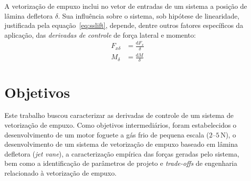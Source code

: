 A vetorização de empuxo inclui no vetor de entradas de um sistema a posição de lâmina defletora \(\delta \). Sua influência sobre o sistema, sob hipótese de linearidade, justificada pela equação~\ref{eq:sslift}, depende, dentre outros fatores específicos da aplicação, das \textit{derivadas de controle} de força lateral e momento:
\begin{align}
    F_{x\delta} &= \frac{\mathrm{d}F_x}{\delta} \\
    M_{\delta} &= \frac{\mathrm{d}M}{\delta}
\end{align}

\section{Objetivos}

Este trabalho buscou caracterizar as derivadas de controle de um sistema de vetorização de empuxo. Como objetivos intermediários, foram estabelecidos o desenvolvimento de um motor foguete a gás frio de pequena escala (\(2\)--\(5\,\mathrm{N}\)), o desenvolvimento de um sistema de vetorização de empuxo baseado em lâmina defletora (\textit{jet vane}), a caracterização empírica das forças geradas pelo sistema, bem como a identificação de parâmetros de projeto e \textit{trade-offs} de engenharia relacionado à vetorização de empuxo.